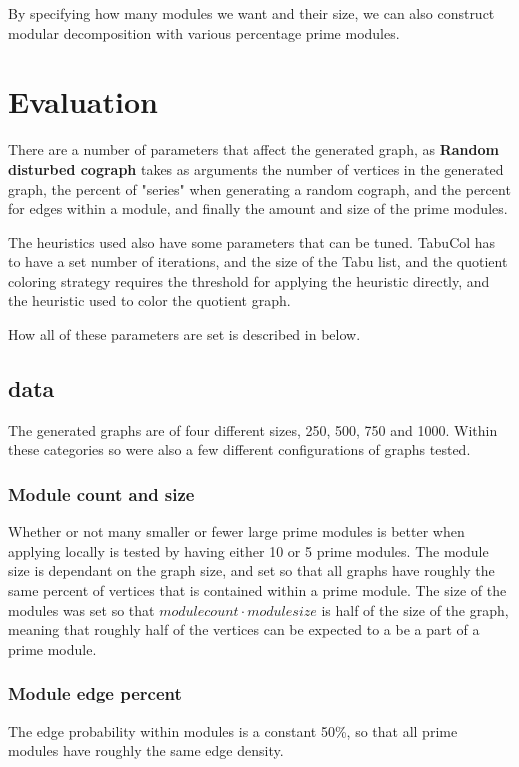 \documentclass[a4paper]{article}
\begin{document}
By specifying how many modules we want and their size, we
can also construct modular decomposition with various percentage prime modules.

\section{Evaluation} 
\label{sec:Evaluation} 

There are a number of parameters that affect the generated graph, as
\textbf{Random disturbed cograph} takes as arguments the number of vertices in
the generated graph, the percent of "series" when generating a random cograph,
and the percent for edges within a module, and finally the amount and size of
the prime modules. 

The heuristics used also have some parameters that can be tuned. TabuCol has to
have a set number of iterations, and the size of the Tabu list, and the quotient
coloring strategy requires the threshold for applying the heuristic directly,
and the heuristic used to color the quotient graph.


How all of these parameters are set is described in below.

\subsection{data}

The generated graphs are of four different sizes, 250, 500, 750 and 1000. 
Within these categories so were also a few different configurations of graphs
tested. 

\subsubsection{Module count and size}
Whether or not many smaller or fewer large prime modules is better when
applying locally is tested by having either 10 or 5 prime modules. 
The module size is dependant on the graph size, and set so that all graphs 
have roughly the same percent of vertices that is contained within a prime
module. The size of the modules was set 
so that $module count \cdot module size$ is half of the size of the graph,
meaning that roughly half of the vertices can be expected to a be a part of a 
prime module.

\subsubsection{Module edge percent}
The edge probability within modules is a  constant 50\%, so that all
prime modules have roughly the same edge density. 
\end{document}
